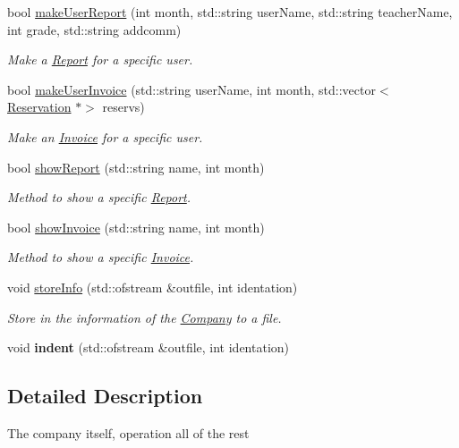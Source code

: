 \begin{DoxyCompactItemize}
bool \mbox{\hyperlink{class_company_a6fe989c0c3da3db723e37f6a71378fd4}{make\+User\+Report}} (int month, std\+::string user\+Name, std\+::string teacher\+Name, int grade, std\+::string addcomm)
\begin{DoxyCompactList}\small\item\em Make a \mbox{\hyperlink{class_report}{Report}} for a specific user. \end{DoxyCompactList}\item 
bool \mbox{\hyperlink{class_company_a0d3e4de51625c91610516fba5aac7acf}{make\+User\+Invoice}} (std\+::string user\+Name, int month, std\+::vector$<$ \mbox{\hyperlink{class_reservation}{Reservation}} $\ast$$>$ reservs)
\begin{DoxyCompactList}\small\item\em Make an \mbox{\hyperlink{class_invoice}{Invoice}} for a specific user. \end{DoxyCompactList}\item 
bool \mbox{\hyperlink{class_company_a2c00c88b245aef0e0e52864b585f8f6b}{show\+Report}} (std\+::string name, int month)
\begin{DoxyCompactList}\small\item\em Method to show a specific \mbox{\hyperlink{class_report}{Report}}. \end{DoxyCompactList}\item 
bool \mbox{\hyperlink{class_company_ad3d0ab0209f13ca48a83df34564ef055}{show\+Invoice}} (std\+::string name, int month)
\begin{DoxyCompactList}\small\item\em Method to show a specific \mbox{\hyperlink{class_invoice}{Invoice}}. \end{DoxyCompactList}\item 
void \mbox{\hyperlink{class_company_ac03f62f1accf21eb445a7aa5731b1199}{store\+Info}} (std\+::ofstream \&outfile, int identation)
\begin{DoxyCompactList}\small\item\em Store in the information of the \mbox{\hyperlink{class_company}{Company}} to a file. \end{DoxyCompactList}\item 
\mbox{\label{class_company_aa2885e87763b9fa599ec4935d3ded6cc}} 
void {\bfseries indent} (std\+::ofstream \&outfile, int identation)
\end{DoxyCompactItemize}


\subsection{Detailed Description}
The company itself, operation all of the rest 

